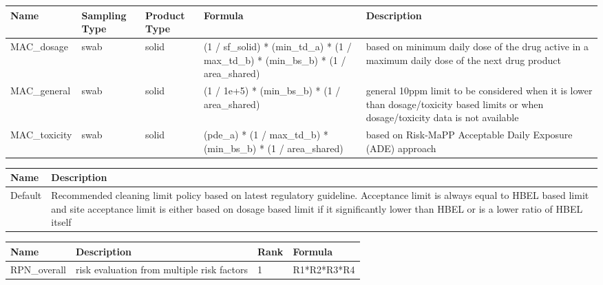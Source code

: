 \documentclass{article}
\begin{document}
        \begin{longtable}[l]{|p{2.5cm}|p{1.5cm}|p{1.2cm}|p{5cm}|p{6cm}|}

\hline
Name & Sampling Type & Product Type & Formula & Description\\
\hline

MAC\_dosage & swab & solid & (1 / sf\_solid) * (min\_td\_a) * (1 / max\_td\_b) * (min\_bs\_b) * (1 / area\_shared) & based on minimum daily dose of the drug active in a maximum daily dose of the next drug product\\
\hline
MAC\_general & swab & solid & (1 / 1e+5) * (min\_bs\_b) * (1 / area\_shared) & general 10ppm limit to be considered when it is lower than dosage/toxicity based limits or when dosage/toxicity data is not available\\
\hline
MAC\_toxicity & swab & solid & (pde\_a) * (1 / max\_td\_b) * (min\_bs\_b) * (1 / area\_shared) & based on Risk-MaPP Acceptable Daily Exposure (ADE) approach\\
\hline

    \end{longtable}
    
        \begin{longtable}[l]{|p{1.5cm}|p{14cm}|}

\hline
Name & Description\\
\hline

Default & Recommended cleaning limit policy based on latest regulatory   guideline. Acceptance limit is always equal to HBEL based limit and site acceptance limit is either based   on dosage based limit if it significantly lower than HBEL or is a lower ratio of HBEL itself\\
\hline

    \end{longtable}
    
        \begin{longtable}[l]{|p{2cm}|p{3cm}|p{1.5cm}|p{3cm}|}

\hline
Name & Description & Rank & Formula\\
\hline

RPN\_overall & risk evaluation from multiple risk factors & 1 & R1*R2*R3*R4\\
\hline

    \end{longtable}
    
        
        \newpage
\end{document}
